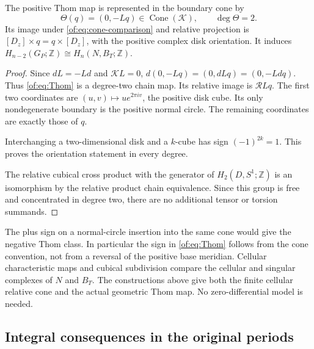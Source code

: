 \begin{proposition}\label{of:prop:Thom}
The positive Thom map is represented in the boundary cone by
\begin{equation}\label{of:eq:Thom}
 \Theta(q)=(0,-Lq)\in\operatorname{Cone}(\mathscr K),
 \qquad \deg\Theta=2.
\end{equation}
Its image under \eqref{of:eq:cone-comparison} and relative projection is
$[D_z]\times q=q\times[D_z]$, with the positive complex disk orientation.
It induces $H_{n-2}(G_P;\mathbb Z)\cong H_n(N,B_T;\mathbb Z)$.
\end{proposition}

\begin{proof}
Since $dL=-Ld$ and $\mathscr K L=0$,
$d(0,-Lq)=(0,dLq)=(0,-Ldq)$.
Thus \eqref{of:eq:Thom} is a degree-two chain map.
Its relative image is $\mathcal R Lq$.
The first two coordinates are
$(u,v)\mapsto u e^{2\pi iv}$, the positive disk cube.
Its only nondegenerate boundary is the positive normal circle.
The remaining coordinates are exactly those of $q$.

Interchanging a two-dimensional disk and a $k$-cube has sign $(-1)^{2k}=1$.
This proves the orientation statement in every degree.

The relative cubical cross product with the generator of
$H_2(D,S^1;\mathbb Z)$ is an isomorphism by the relative product
chain equivalence. Since this group is free and concentrated in degree two,
there are no additional tensor or torsion summands.
\end{proof}

The plus sign on a normal-circle insertion into the same cone would give
the negative Thom class. In particular the sign in
\eqref{of:eq:Thom} follows from the cone convention, not from a reversal
of the positive base meridian.
Cellular characteristic maps and cubical subdivision compare the cellular
and singular complexes of $N$ and $B_T$.
The constructions above give both the finite cellular relative cone and
the actual geometric Thom map. No zero-differential model is needed.

\subsection{Integral consequences in the original periods}


